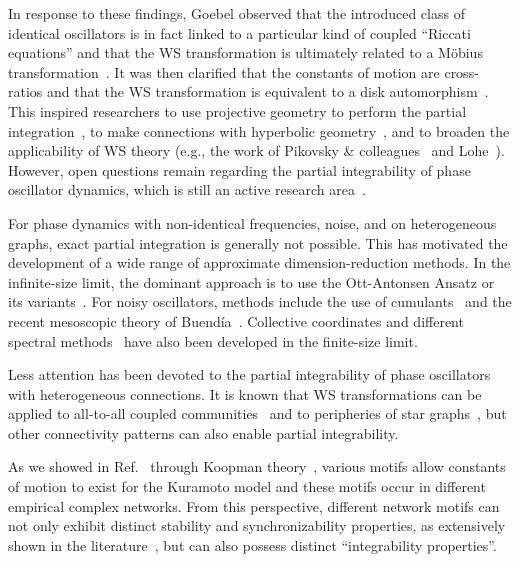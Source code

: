 \documentclass[aps,pre,reprint,longbibliography,superscriptaddress,noshowpacs,floatfix]{revtex4-2}
\theoremstyle{definition}
\theoremstyle{remark}
\begin{document}
In response to these findings, Goebel observed that the introduced class of identical oscillators is in fact linked to a particular kind of coupled ``Riccati equations'' and that the WS transformation is ultimately related to a M\"{o}bius transformation~\cite{Goebel1995}. It was then clarified that the constants of motion are cross-ratios and that the WS transformation is equivalent to a disk automorphism~\cite{Marvel2009}. This inspired researchers to use projective geometry to perform the partial integration~\cite{Stewart2011}, to make connections with hyperbolic geometry~\cite{Chen2017b, Chen2019, Lipton2021}, and to broaden the applicability of WS theory (e.g., the work of Pikovsky \& colleagues~\cite{Pikovsky2008, Pikovsky2011, Vlasov2016a} and Lohe~\cite{Lohe2017, Lohe2018, Lohe2019, Lohe2020, Lohe2025, Lohe2025f}). However, open questions remain regarding the partial integrability of phase oscillator dynamics, which is still an active research area~\cite{Chen2017b, Lipton2021, Thumler2023, Cestnik2024}.

For phase dynamics with non-identical frequencies, noise, and on heterogeneous graphs, exact partial integration is generally not possible. This has motivated the development of a wide range of approximate dimension-reduction methods. In the infinite-size limit, the dominant approach is to use the Ott-Antonsen Ansatz or its variants~\cite{Ott2008, Abrams2008, Chen2017, Bick2020, Engelbrecht2020, Cestnik2022b, Cestnik2022c}. For noisy oscillators, methods include the use of cumulants~\cite{Tyulkina2018,Cestnik2022b, Goldobin2018, Goldobin2019,Goldobin2019oa, Goldobin2021} and the recent mesoscopic theory of Buendía~\cite{Buendia2025}. Collective coordinates \cite{Gottwald2015, Gottwald2017} and different spectral methods~\cite{Gfeller2007, Gfeller2008, Kalloniatis2010, Thibeault2020, Timofeyev2025} have also been developed in the finite-size limit.

Less attention has been devoted to the partial integrability of phase oscillators with heterogeneous connections. It is known that WS transformations can be applied to all-to-all coupled communities~\cite{Pikovsky2008, Hong2011_pre} and to peripheries of star graphs~\cite{Vlasov2015, Vlasov2015a, Vlasov2017, Xu2018, Xu2019, Chen2019a}, but other connectivity patterns can also enable partial integrability.

As we showed in Ref.~\cite{Thibeault2026} through Koopman theory~\cite{Koopman1931, Koopman1932, VonNeumann1932, Carleman1932, Budisic2012, Brunton2022, Mezic2004, Mezic2005, Mauroy2013, Mauroy2016, Mezic2019, Joseph2020}, various motifs allow constants of motion to exist for the Kuramoto model and these motifs occur in different empirical complex networks. From this perspective, different network motifs can not only exhibit distinct stability and synchronizability properties, as extensively shown in the literature~\cite{Ashwin1992, Golubitsky1999, *Golubitsky2002, *Golubitsky2006, *Golubitsky2023, Milo2002, Moreno2004, Lodato2007, DHuys2008, Morone2019a, *Morone2020, *Makse2025, Angulo2015, Schaub2016, Aguiar2018}, but can also possess distinct ``integrability properties''.
\end{document}
